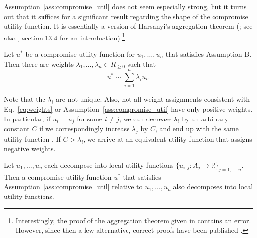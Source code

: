 Assumption~\ref{ass:compromise_util} does not seem especially strong, but it turns out that it
suffices for a significant result regarding the shape of the compromise utility function. It is
essentially a version of Harsanyi's aggregation theorem (\cite{Harsanyi1955-ou}; see also
\cite{Peterson2017-pa}, section 13.4 for an introduction).\footnote{Interestingly, the proof of the
    aggregation theorem given in \citeyear{Harsanyi1955-ou} contains an error. However, since then
    a few alternative, correct proofs have been published
    \parencite{Fishburn1984-zh,Border1985-mw,Hammond_undated-bp}.}

\begin{theorem}
\parencite{Resnik1983-hl,Fishburn1984-zh} Let \(u^{*}\) be
a compromise utility function for \(u_{1},\dotsc,u_{n}\) that satisfies
Assumption B. Then there are weights
\(\lambda_{1},\dotsc,\lambda_{n} \in R_{\geq 0}\) such that
\begin{equation}
    u^{*} \sim \sum_{i=1}^n\lambda_{i}u_{i}.
    \label{eq:weights}
\end{equation}
    \label{th:compromise}
\end{theorem}

Note that the \(\lambda_{i}\) are not unique. Also, not all weight
assignments consistent with Eq.~\eqref{eq:weights} or Assumption~\ref{ass:compromise_util} have only positive
weights. In particular, if \(u_{i} = u_{j}\) for some \(i \neq j\), we
can decrease \(\lambda_{i}\) by an arbitrary constant \(C\) if we
correspondingly increase \(\lambda_{j}\) by \(C\), and end up with the
same utility function
\parencite{Resnik1983-hl,Fishburn1984-zh}. If
\(C > \lambda_{i}\), we arrive at an equivalent utility function that
assigns negative weights.


\begin{theorem}
Let \(u_{1},\dotsc,u_{n}\) each decompose into local utility functions \(\{{ u}_{i,j}\colon A_{j} \rightarrow
\mathbb{R}\}_{j = 1,\dotsc,n}\).  Then a compromise utility function \(u^{*}\) that satisfies
Assumption~\ref{ass:compromise_util} relative to \(u_{1},\dotsc,u_{n}\) also decomposes into local
utility functions.
    \label{th:decompose}
\end{theorem}

